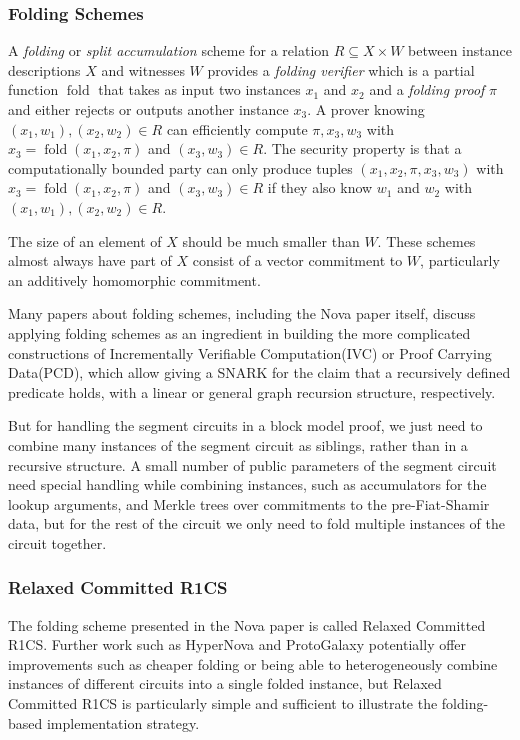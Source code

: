 \documentclass{article}
\theoremstyle{plain}
\theoremstyle{definition}
\begin{document}
\subsubsection{Folding Schemes}

A \emph{folding} or \emph{split accumulation} scheme for a relation
\(R \subseteq X \times W\) between instance descriptions \(X\) and
witnesses \(W\) provides a \emph{folding verifier} which is a partial
function $\operatorname{fold}$ that takes as input two instances $x_1$ and $x_2$ and a
\emph{folding proof} $\pi$ and either rejects or outputs another instance
$x_3$.
A prover knowing $(x_1,w_1), (x_2,w_2) \in R$ can efficiently compute
$\pi, x_3, w_3$ with $x_3 = \operatorname{fold}(x_1,x_2,\pi)$ and $(x_3,w_3) \in R$.
The security property is that a computationally bounded party can only
produce tuples $(x_1,x_2,\pi,x_3,w_3)$
with $x_3 = \operatorname{fold}(x_1,x_2,\pi)$ and $(x_3,w_3) \in R$ if they
also know $w_1$ and $w_2$ with $(x_1,w_1), (x_2,w_2) \in R$.

The size of an element of \(X\) should be much smaller than \(W\). These
schemes almost always have part of \(X\) consist of a vector commitment
to \(W\), particularly an additively homomorphic commitment.

Many papers about folding schemes, including the Nova paper \cite{Nova} itself,
discuss applying folding schemes as an ingredient in building the more
complicated constructions of Incrementally Verifiable Computation(IVC) or
Proof Carrying Data(PCD), which allow giving a SNARK for the claim that
a recursively defined predicate holds, with a linear or general graph
recursion structure, respectively.

But for handling the segment circuits in a block model proof, we just
need to combine many instances of the segment circuit as siblings,
rather than in a recursive structure.
A small number of public parameters of the segment circuit need special
handling while combining instances, such as accumulators for the
lookup arguments, and Merkle trees over commitments to the pre-Fiat-Shamir data,
but for the rest of the circuit we only need to fold multiple instances
of the circuit together.

\subsubsection{Relaxed Committed R1CS}
The folding scheme presented in the Nova paper is called Relaxed Committed R1CS.
Further work such as HyperNova and ProtoGalaxy potentially offer improvements
such as cheaper folding or being able to heterogeneously combine instances of different circuits
into a single folded instance, but Relaxed Committed R1CS is particularly simple and
sufficient to illustrate the folding-based implementation strategy.
\end{document}
